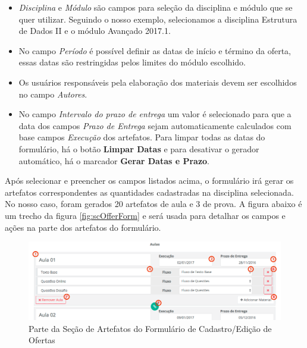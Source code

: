 \begin{itemize}
	\item \textit{Disciplina} e \textit{Módulo} são campos para seleção da disciplina e módulo que se quer utilizar. Seguindo o nosso exemplo,  selecionamos a disciplina Estrutura de Dados II e o módulo Avançado 2017.1.
	\item No campo \textit{Período} é possível definir as datas de início e término da oferta, essas datas são restringidas pelos limites do módulo escolhido.
	\item Os usuários responsáveis pela elaboração dos materiais devem ser escolhidos no campo \textit{Autores}.
	\item No campo \textit{Intervalo do prazo de entrega} um valor é selecionado para que a data dos campos \textit{Prazo de Entrega} sejam automaticamente calculados com base campos \textit{Execução} dos artefatos. Para limpar todas as datas do formulário, há o botão \textbf{Limpar Datas} e para desativar o gerador automático, há o marcador \textbf{Gerar Datas e Prazo}.
\end{itemize}

Após selecionar e preencher os campos listados acima, o formulário irá gerar os artefatos correspondentes as quantidades cadastradas na disciplina selecionada. No nosso caso, foram gerados 20 artefatos de aula e 3 de prova. A figura abaixo é um trecho da figura \hyperref[fig:scOfferForm]{\ref{fig:scOfferForm}} e será usada para detalhar os campos e ações na parte dos artefatos do formulário.

\begin{figure}[H]
\centering
     \includegraphics[width=1.0\textwidth]{Screens/ArtifactsForm.png}
      \caption{Parte da Seção de Artefatos do Formulário de Cadastro/Edição de Ofertas}
       \label{fig:scArtifactsForm}
\end{figure}

